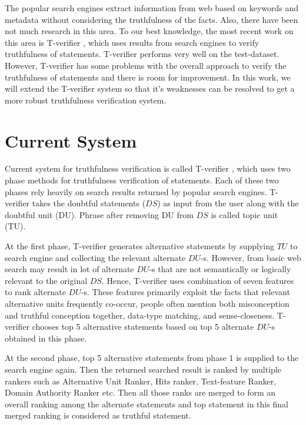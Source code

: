 \documentclass[11pt]{article}
\begin{document}
The popular search engines extract information from web based on keywords and
metadata without considering the truthfulness of the facts. Also, there have been
not much research in this area. To our best knowledge, the most recent work on this area is T-verifier  \cite{tverifier}, which uses results from search engines
to verify truthfulness of statements. T-verifier performs very well on the
test-dataset. However, T-verifier has some problems with the overall approach to
verify the truthfulness of statements and there is room for improvement. In this
work, we will extend the T-verifier system so that it's weaknesses can be
resolved to get a more robust truthfulness verification system.


\section{Current System}
Current system for truthfulness verification is called T-verifier
\cite{tverifier}, which uses two phase methods for truthfulness verification of
statements. Each of these two phases rely heavily on search results returned by
popular search engines. T-verifier takes the doubtful statements ($DS$) as input
from the user along with the doubtful unit (DU). Phrase after removing DU from $DS$
is called topic unit (TU).

At the first phase, T-verifier generates alternative statements by supplying
$TU$ to search engine and collecting the relevant alternate $DU$-s. However,
from basic web search may result in lot of alternate $DU$-s that are not semantically or
logically relevant to the original $DS$. Hence, T-verifier uses combination of
seven features to rank alternate $DU$-s. These features primarily exploit the facts
that relevant alternative units frequently co-occur, people often mention both
misconception and truthful conception together, data-type matching, and
sense-closeness. T-verifier chooses top 5 alternative statements based on top 5
alternate $DU$-s obtained in this phase.

At the second phase, top 5 alternative statements from phase 1 is supplied to the
search engine again. Then the returned searched result is ranked by multiple
rankers such as Alternative Unit Ranker, Hits ranker, Text-feature Ranker, Domain
Authority Ranker etc. Then all those ranks are merged to form an overall ranking
among the alternate statements and top statement in this final merged ranking is
considered as truthful statement.
\end{document}
